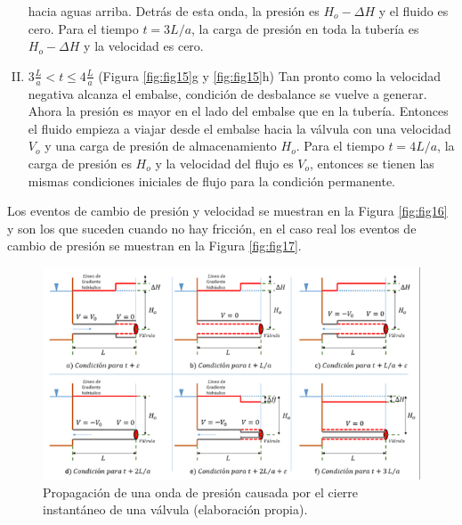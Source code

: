 \documentclass[letterpaper]{report}
\begin{document}
\begin{enumerate}[I.]
	hacia aguas arriba. Detrás de esta onda, la presión es $H_o-\Delta H$ y el fluido es cero. Para el tiempo $t=3L/a$, la carga de presión en toda la tubería es $H_o-\Delta H$ y la 
	velocidad es cero.
	\item	$3\frac{L}{a} <t \le 4\frac{L}{a}$ (Figura \ref{fig:fig15}g y \ref{fig:fig15}h) Tan pronto como la velocidad negativa alcanza el embalse, condición de desbalance se vuelve a generar. Ahora la 
	presión es mayor en el lado del embalse que en la tubería. Entonces el fluido empieza a viajar desde el embalse hacia la válvula con una velocidad $V_o$ y una carga de presión de 
	almacenamiento $H_o$. Para el tiempo $t=4L/a$, la carga de presión es $H_o$ y la velocidad del flujo es $V_o$, entonces se tienen las mismas condiciones iniciales de flujo para 
	la condición permanente.
\end{enumerate}
Los eventos de cambio de presión y velocidad se muestran en la Figura \ref{fig:fig16} y son los que suceden cuando no hay fricción, en el caso real los eventos de cambio de presión se muestran 
en la Figura \ref{fig:fig17}.

\begin{figure}[H]
	\centering
	\includegraphics[width=0.90\linewidth]{fig14}
	\caption{Propagación de una onda de presión causada por el cierre instantáneo de una válvula (elaboración propia).}
	\label{fig:fig14}
\end{figure}
\end{document}
